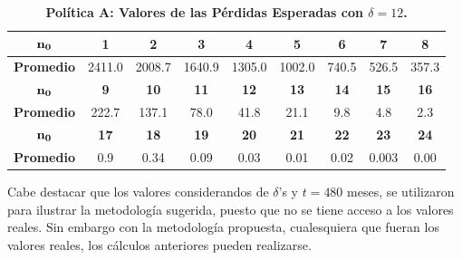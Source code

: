 %
%


\begin{table}[h!]\small
\centering
\caption{\bf Pol\'itica A: Valores de las P\'erdidas Esperadas con $\delta=12$.}\label{c777}
\vspace{.3cm}\begin{tabular}{ccccccccc}
\toprule[0.6mm]
$\bf{n_0}$ &\bf{1} &                   \bf{2} &                   \bf{3} &                   \bf{ 4 }&                    \bf{ 5}&              \bf{ 6} &               \bf{ 7} & \bf{8} \\
\hline
{\bf Promedio} & 2411.0  & 2008.7 &1640.9 &1305.0&1002.0 & 740.5 & 526.5 & 357.3    \\
\hline
$\bf{n_0}$&\bf{9} &                \bf{ 10}&              \bf{      11} &                   \bf{ 12} &               \bf{      13}&              \bf{14} &  \bf{ 15} & \bf{16 }   \\
\hline
{\bf Promedio}&	 222.7 & 137.1 &  78.0 &   41.8 &  21.1  &   9.8  &    4.8  &  2.3    \\
	 \hline
	
$\bf{n_0}$&\bf{17} &     \bf{ 18}&   \bf{19}&   \bf{ 20} &           \bf{   21}&                \bf{  22}  & \bf{23} &\bf {24}  \\
\hline
   {\bf Promedio} &  0.9    &  0.34 &   0.09 &   0.03 &   0.01 &   0.02 &   0.003  & 0.00\\
\toprule[0.6mm]
\end{tabular}

\end{table}
\newpage
\noindent Cabe destacar que los valores considerandos de $\delta$'s y $t=480$ meses, se utilizaron para  ilustrar la metodolog\'ia sugerida, puesto que no se tiene acceso a los valores reales. Sin embargo con la metodolog\'ia propuesta, cualesquiera que fueran los valores reales, los c\'alculos anteriores pueden realizarse.

